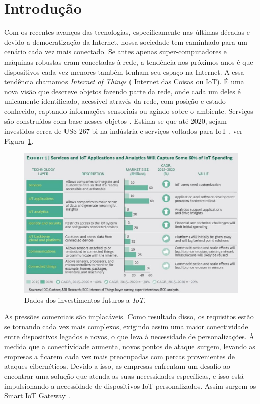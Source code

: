 \section*{Introdução}
\label{sec:intro}

Com os recentes avanços das tecnologias, especificamente nas últimas décadas e devido a democratização da Internet, nossa sociedade tem caminhado para um cenário cada vez mais conectado. Se antes apenas super-computadores e máquinas robustas eram conectadas à rede, a tendência nos próximos anos é que dispositivos cada vez menores também tenham seu espaço na Internet.
A essa tendência chamamos \textit{Internet of Things} ( Internet das Coisas ou IoT). É uma nova visão que descreve objetos fazendo parte da rede, onde cada um deles é unicamente identificado, acessível através da rede, com posição e estado conhecido, captando informações sensoriais ou agindo sobre o ambiente. Serviços são construídos com base nesses objetos \cite{ComputerWorld}. Estima-se que até 2020, sejam investidos cerca de US\$ 267 bi na indústria e serviços voltados para IoT \cite{BCGPerspectives,Forbes}, ver Figura~\ref{fig:iotstack}.

\begin{figure}[h!]
	\begin{center}
		\includegraphics[width=1.085\textwidth]{./img/IoT-Stack}
		\caption{Dados dos investimentos futuros a \textit{IoT}.}
		\label{fig:iotstack}
	\end{center}
\end{figure}

As pressões comerciais são implacáveis. Como resultado disso, os requisitos estão se tornando cada vez mais complexos, exigindo assim uma maior conectividade entre dispositivos legados e novos, o que leva à necessidade de personalizações. À medida que a conectividade aumenta, novos pontos de ataque surgem, levando as empresas a ficarem cada vez mais preocupadas com percas provenientes de ataques cibernéticos. Devido a isso, as empresas enfrentam um desafio ao encontrar uma solução que atenda as suas necessidades específicas, e isso está impulsionando a necessidade de dispositivos IoT personalizados. Assim surgem os Smart IoT Gateway \cite{EETAsia}. 

